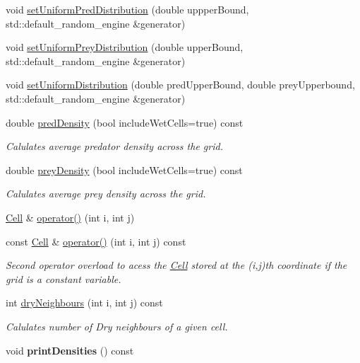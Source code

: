 \begin{DoxyCompactItemize}
void \hyperlink{class_grid_a3a67056a86378f8ce24cdf3c19ee7817}{set\+Uniform\+Pred\+Distribution} (double uppper\+Bound, std\+::default\+\_\+random\+\_\+engine \&generator)
\item 
void \hyperlink{class_grid_a2f366ddaaa75475a9597f9a85ab24d59}{set\+Uniform\+Prey\+Distribution} (double upper\+Bound, std\+::default\+\_\+random\+\_\+engine \&generator)
\item 
void \hyperlink{class_grid_a17c062fcf4063a811bd8d95c32bce723}{set\+Uniform\+Distribution} (double pred\+Upper\+Bound, double prey\+Upperbound, std\+::default\+\_\+random\+\_\+engine \&generator)
\item 
double \hyperlink{class_grid_a25eeb1fef1d86fe74b45e615f0376158}{pred\+Density} (bool include\+Wet\+Cells=true) const
\begin{DoxyCompactList}\small\item\em Calulates average predator density across the grid. \end{DoxyCompactList}\item 
double \hyperlink{class_grid_a7dc8ae18c31e8e680f6369d7c07ea881}{prey\+Density} (bool include\+Wet\+Cells=true) const
\begin{DoxyCompactList}\small\item\em Calulates average prey density across the grid. \end{DoxyCompactList}\item 
\hyperlink{class_cell}{Cell} \& \hyperlink{class_grid_aed06be122077b3a0c1fe7c412c2535fc}{operator()} (int i, int j)
\item 
const \hyperlink{class_cell}{Cell} \& \hyperlink{class_grid_aa89f5c17cb78658f3b82a3b2d93aeb92}{operator()} (int i, int j) const
\begin{DoxyCompactList}\small\item\em Second operator overload to acess the \hyperlink{class_cell}{Cell} stored at the (i,j)th coordinate if the grid is a constant variable. \end{DoxyCompactList}\item 
int \hyperlink{class_grid_a50f4c0db20b466c84a1d65004e51642e}{dry\+Neighbours} (int i, int j) const
\begin{DoxyCompactList}\small\item\em Calulates number of Dry neighbours of a given cell. \end{DoxyCompactList}\item 
\mbox{\label{class_grid_a9ca9619c72c3132ad928dab64f587e82}} 
void {\bfseries print\+Densities} () const
\end{DoxyCompactItemize}

